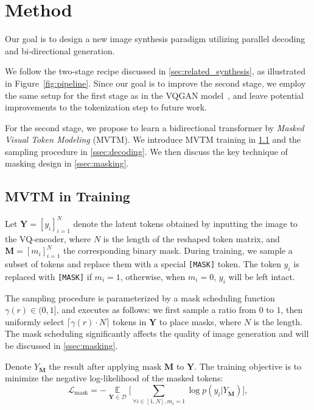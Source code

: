 
\section{Method}
\label{sec:method}
Our goal is to design a new image synthesis paradigm utilizing parallel decoding and bi-directional generation.

We follow the two-stage recipe discussed in \ref{sec:related_synthesis}, as illustrated in Figure~\ref{fig:pipeline}. Since our goal is to improve the second stage, we employ the same setup for the first stage as in the VQGAN model~\cite{Esser21vqgan}, and leave potential improvements to the tokenization step to future work.

For the second stage, we propose to learn a bidirectional transformer by \textit{Masked Visual Token Modeling} (MVTM). We introduce MVTM training in \ref{ssec:model} and the sampling procedure in \ref{ssec:decoding}. We then discuss the key technique of masking design in \ref{ssec:masking}. 


\subsection{MVTM in Training}
\label{ssec:model}
\newcommand{\unknownmask}[0]{{\mathbf{M}}}
\newcommand{\mathy}[0]{{\mathbf{Y}}}
\newcommand{\knownmask}[0]{{\overline{\mathbf{M}}}}
Let $\mathy=[y_i]_{i=1}^N$ denote the latent tokens obtained by inputting the image to the VQ-encoder, where $N$ is the length of the reshaped token matrix, and $\unknownmask=[m_i]_{i=1}^N$ the corresponding binary mask. During training, we sample a subset of tokens and replace them with a special \texttt{[MASK]} token. The token $y_i$ is replaced with \texttt{[MASK]} if $m_i=1$, otherwise, when $m_i=0$, $y_i$ will be left intact. 

The sampling procedure is parameterized by a mask scheduling function $\gamma (r) \in (0,1]$, and executes as follows: we first sample a ratio from $0$ to $1$, then uniformly select $\lceil \gamma(r) \cdot N \rceil$ tokens in $\mathy$ to place masks, where $N$ is the length. The mask scheduling significantly affects the quality of image generation and will be discussed in \ref{ssec:masking}.

Denote $Y_{\knownmask}$ the result after applying mask $\unknownmask$ to $\mathy$.
The training objective is to minimize the negative log-likelihood of the masked tokens:
\begin{equation}
\label{eq:loss}
\mathcal{L}_{\text{mask}} = - \mathop{\mathbb{E}} \limits_{\mathy  \in \mathcal{D}} \Big[ \sum_{\forall i \in [1,N], m_i=1} \log p(y_i| Y_{\knownmask}) \Big],
\end{equation}

